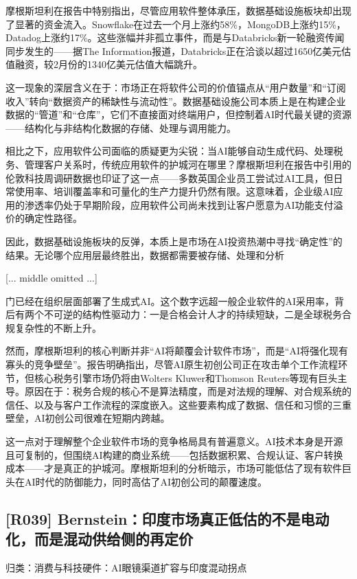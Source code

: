 \documentclass[11pt]{ctexart}
\begin{document}
摩根斯坦利在报告中特别指出，尽管应用软件整体承压，数据基础设施板块却出现了显著的资金流入。Snowflake在过去一个月上涨约58\%，MongoDB上涨约15\%，Datadog上涨约17\%。这些涨幅并非孤立事件，而是与Databricks新一轮融资传闻同步发生的——据The Information报道，Databricks正在洽谈以超过1650亿美元估值融资，较2月份的1340亿美元估值大幅跳升。

这一现象的深层含义在于：市场正在将软件公司的价值锚点从“用户数量”和“订阅收入”转向“数据资产的稀缺性与流动性”。数据基础设施公司本质上是在构建企业数据的“管道”和“仓库”，它们不直接面对终端用户，但控制着AI时代最关键的资源——结构化与非结构化数据的存储、处理与调用能力。

相比之下，应用软件公司面临的质疑更为尖锐：当AI能够自动生成代码、处理税务、管理客户关系时，传统应用软件的护城河在哪里？摩根斯坦利在报告中引用的伦敦科技周调研数据也印证了这一点——多数英国企业员工尝试过AI工具，但日常使用率、培训覆盖率和可量化的生产力提升仍然有限。这意味着，企业级AI应用的渗透率仍处于早期阶段，应用软件公司尚未找到让客户愿意为AI功能支付溢价的确定性路径。

因此，数据基础设施板块的反弹，本质上是市场在AI投资热潮中寻找“确定性”的结果。无论哪个应用层最终胜出，数据都需要被存储、处理和分析

[... middle omitted ...]

门已经在组织层面部署了生成式AI。这个数字远超一般企业软件的AI采用率，背后有两个不可逆的结构性驱动力：一是合格会计人才的持续短缺，二是全球税务合规复杂性的不断上升。

然而，摩根斯坦利的核心判断并非“AI将颠覆会计软件市场”，而是“AI将强化现有寡头的竞争壁垒”。报告明确指出，尽管AI原生初创公司正在攻击单个工作流程环节，但核心税务引擎市场仍将由Wolters Kluwer和Thomson Reuters等现有巨头主导。原因在于：税务合规的核心不是算法精度，而是对法规的理解、对合规系统的信任、以及与客户工作流程的深度嵌入。这些要素构成了数据、信任和习惯的三重壁垒，AI初创公司很难在短期内跨越。

这一点对于理解整个企业软件市场的竞争格局具有普遍意义。AI技术本身是开源且可复制的，但围绕AI构建的商业系统——包括数据积累、合规认证、客户转换成本——才是真正的护城河。摩根斯坦利的分析暗示，市场可能低估了现有软件巨头在AI时代的防御能力，同时高估了AI初创公司的颠覆速度。

\subsection{[R039] Bernstein：印度市场真正低估的不是电动化，而是混动供给侧的再定价}
{\small\color{refgray}归类：消费与科技硬件：AI眼镜渠道扩容与印度混动拐点}
\end{document}
